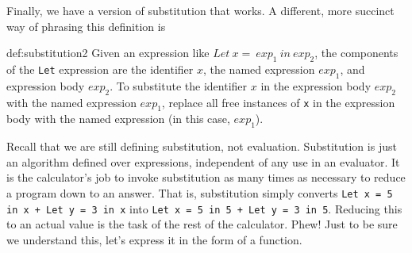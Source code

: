 \documentclass{book}
\makeatletter
\newcommand{\Conid}[1]{\mathit{#1}}
\newcommand{\Varid}[1]{\mathit{#1}}
\newcommand{\anonymous}{\kern0.06em \vbox{\hrule\@width.5em}}
\def\resethooks{%
  \global\let\SaveRestoreHook\empty
  \global\let\ColumnHook\empty}
\let\hspre\empty
\let\hspost\empty
\makeatother
\begin{document}
Finally, we have a version of substitution that works. A different, 
more succinct way of phrasing this definition is


\begin{mydef}{def:substitution2}
Given an expression like $Let\ x =\ exp_1\ in\ exp_2$,
the components of the \texttt{Let} expression are the 
identifier \texttt{$x$}, the named expression \texttt{$exp_1$}, 
and expression body \texttt{$exp_2$}. To substitute 
the identifier \texttt{$x$} in the expression body \texttt{$exp_2$} 
with the named expression \texttt{$exp_1$}, replace all 
free instances of \texttt{x} in the expression body with 
the named expression (in this case, $exp_1$).
\end{mydef}

Recall that we are still defining substitution, not 
evaluation. Substitution is just an algorithm 
defined over expressions, independent of any use in an 
evaluator. It is the calculator's job to invoke substitution 
as many times as necessary to reduce a program down to an 
answer. That is, substitution simply converts 
\texttt{Let x = 5 in x + Let y = 3 in x} into 
\texttt{Let x = 5 in 5 + Let y = 3 in 5}. Reducing this to 
an actual value is the task of the rest of the calculator. Phew! 
Just to be sure we understand this, let's express it in the form 
of a function. 

\resethooks
 
\end{document}
